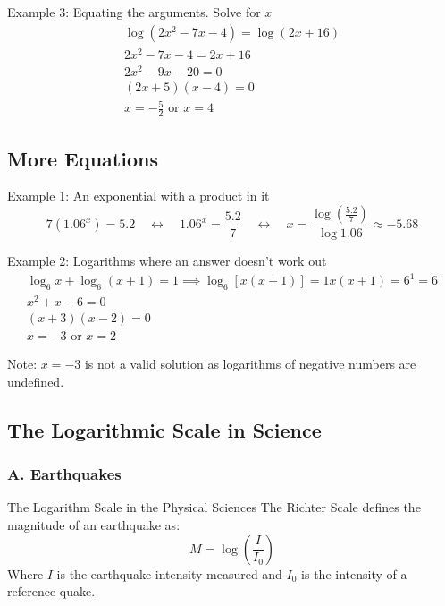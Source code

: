 \documentclass{article}
\begin{document}
\begin{examplebox}{Example 3: Equating the arguments. Solve for \( x \)}
\begin{align*}
\log{(2x^2 - 7x - 4)} = \log{(2x + 16)} \\
2x^2 - 7x - 4 = 2x + 16 \\
2x^2 - 9x - 20 = 0 \\
(2x + 5)(x - 4) = 0 \\
x = -\frac{5}{2} \text{ or } x = 4
\end{align*}

\end{examplebox}

\subsection{More Equations}

\begin{examplebox}{Example 1: An exponential with a product in it}
\[
7(1.06^x) = 5.2 \quad \leftrightarrow \quad 1.06^x = \frac{5.2}{7} \quad \leftrightarrow \quad x = \frac{\log{\left(\frac{5.2}{7}\right)}}{\log{1.06}} \approx -5.68
\]
\end{examplebox}

\begin{examplebox}{Example 2: Logarithms where an answer doesn't work out}
\begin{align*}
\log_6{x} + \log_6{(x+1)} = 1 \implies \log_6{[x(x+1)]} = 1 
x(x+1) = 6^1 = 6 \\
x^2 + x - 6 = 0 \\
(x+3)(x-2) = 0 \\
x = -3 \text{ or } x = 2
\end{align*}


Note: \( x = -3 \) is not a valid solution as logarithms of negative numbers are undefined.
\end{examplebox}

\subsection{The Logarithmic Scale in Science}

\subsubsection{A. Earthquakes}
\begin{lessonbox}{The Logarithm Scale in the Physical Sciences}
The Richter Scale defines the magnitude of an earthquake as:
\[
M = \log{\left(\frac{I}{I_0}\right)}
\]
Where \( I \) is the earthquake intensity measured and \( I_0 \) is the intensity of a reference quake.
\end{lessonbox}
\end{document}
